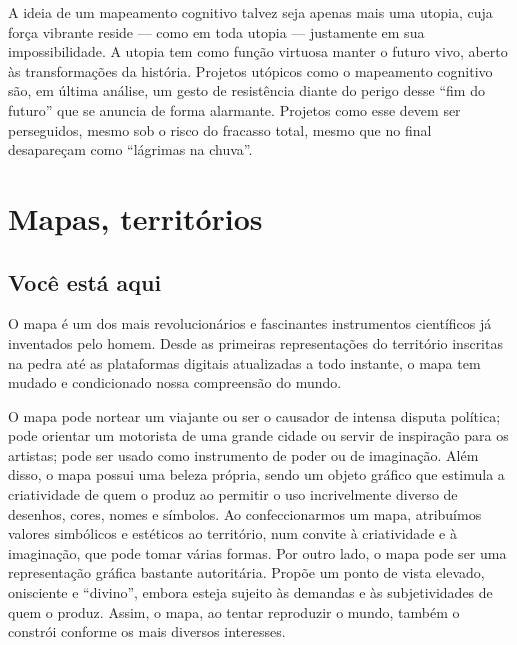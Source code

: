 A ideia de um mapeamento cognitivo talvez seja apenas mais uma utopia,
cuja força vibrante reside --- como em toda utopia --- justamente em sua
impossibilidade. A utopia tem como função virtuosa manter o futuro vivo,
aberto às transformações da história. Projetos utópicos como o
mapeamento cognitivo são, em última análise, um gesto de resistência
diante do perigo desse ``fim do futuro'' que se anuncia de forma
alarmante. Projetos como esse devem ser perseguidos, mesmo sob o risco
do fracasso total, mesmo que no final desapareçam como ``lágrimas na
chuva''.


\part{Mapas, territórios}
\removeepigraph

\chapter{Você está aqui}

O mapa é um dos mais revolucionários e fascinantes instrumentos
científicos já inventados pelo homem. Desde as primeiras representações
do território inscritas na pedra até as plataformas digitais atualizadas
a todo instante, o mapa tem mudado e condicionado nossa compreensão do
mundo.

O mapa pode nortear um viajante ou ser o causador de intensa disputa
política; pode orientar um motorista de uma grande cidade ou servir de
inspiração para os artistas; pode ser usado como instrumento de poder ou
de imaginação. Além disso, o mapa possui uma beleza própria, sendo um
objeto gráfico que estimula a criatividade de quem o produz ao permitir
o uso incrivelmente diverso de desenhos, cores, nomes e símbolos. Ao
confeccionarmos um mapa, atribuímos valores simbólicos e estéticos ao
território, num convite à criatividade e à imaginação, que pode tomar
várias formas. Por outro lado, o mapa pode ser uma representação gráfica
bastante autoritária. Propõe um ponto de vista elevado, onisciente e
``divino'', embora esteja sujeito às demandas e às subjetividades de
quem o produz. Assim, o mapa, ao tentar reproduzir o mundo, também o
constrói conforme os mais diversos interesses.

